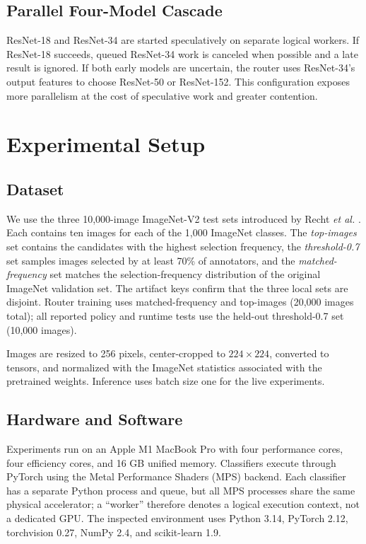 \subsection{Parallel Four-Model Cascade}

ResNet-18 and ResNet-34 are started speculatively on separate logical workers.
If ResNet-18 succeeds, queued ResNet-34 work is canceled when possible and a
late result is ignored.  If both early models are uncertain, the router uses
ResNet-34's output features to choose ResNet-50 or ResNet-152.  This
configuration exposes more parallelism at the cost of speculative work and
greater contention.

\section{Experimental Setup}
\label{sec:setup}

\subsection{Dataset}

We use the three 10,000-image ImageNet-V2 test sets introduced by Recht
\emph{et al.} \cite{recht2019imagenetv2}.  Each contains ten images for each of
the 1,000 ImageNet classes.  The \emph{top-images} set contains the candidates
with the highest selection frequency, the \emph{threshold-0.7} set samples
images selected by at least 70\% of annotators, and the
\emph{matched-frequency} set matches the selection-frequency distribution of
the original ImageNet validation set.  The artifact keys confirm that the
three local sets are disjoint.  Router training uses matched-frequency and
top-images (20,000 images total); all reported policy and runtime tests use the
held-out threshold-0.7 set (10,000 images).

Images are resized to 256 pixels, center-cropped to $224\times224$, converted
to tensors, and normalized with the ImageNet statistics associated with the
pretrained weights.  Inference uses batch size one for the live experiments.

\subsection{Hardware and Software}

Experiments run on an Apple M1 MacBook Pro with four performance cores, four
efficiency cores, and 16 GB unified memory.  Classifiers execute through
PyTorch \cite{paszke2019pytorch} using the Metal Performance Shaders (MPS)
backend.  Each classifier has a separate Python process and queue, but all MPS
processes share the same physical accelerator; a ``worker'' therefore denotes
a logical execution context, not a dedicated GPU.  The inspected environment
uses Python 3.14, PyTorch 2.12, torchvision 0.27, NumPy 2.4, and scikit-learn
1.9.

